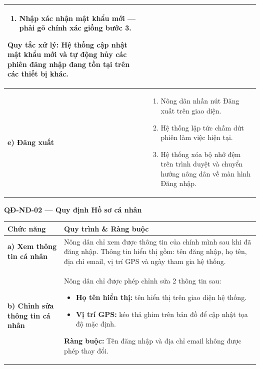 \documentclass[12pt,a4paper]{article}
\begin{document}
\begin{longtable}{|
        >{\raggedright\arraybackslash}p{2.8cm}|
        >{\raggedright\arraybackslash}p{12cm}|}
\begin{enumerate}[leftmargin=*,topsep=2pt,itemsep=1pt]
        \item Nhập \textbf{xác nhận mật khẩu mới} --- phải gõ chính xác giống bước 3.
    \end{enumerate}
    \textbf{Quy tắc xử lý:} Hệ thống cập nhật mật khẩu mới và tự động hủy các phiên đăng nhập đang tồn tại trên các thiết bị khác.                                                                                                                                         \\
    \hline
    \textbf{e) Đăng xuất}          &
    \begin{enumerate}[leftmargin=*,topsep=2pt,itemsep=1pt]
        \item Nông dân nhấn nút Đăng xuất trên giao diện.
        \item Hệ thống lập tức chấm dứt phiên làm việc hiện tại.
        \item Hệ thống xóa bộ nhớ đệm trên trình duyệt và chuyển hướng nông dân về màn hình Đăng nhập.
    \end{enumerate}                                                                                                                                                                      \\
    \hline
\end{longtable}

\vspace{0.3cm}
\noindent\textbf{QĐ-ND-02 --- Quy định Hồ sơ cá nhân}

\begin{longtable}{|
        >{\raggedright\arraybackslash}p{2.8cm}|
        >{\raggedright\arraybackslash}p{12cm}|}
    \hline
    \rowcolor{headerblue}
    \textbf{Chức năng}                      & \textbf{Quy trình \& Ràng buộc}                                                                                                \\
    \hline
    \endhead
    \textbf{a) Xem thông tin cá nhân}       &
    Nông dân chỉ xem được thông tin của chính mình sau khi đã đăng nhập. Thông tin hiển thị gồm: tên đăng nhập, họ tên, địa chỉ email, vị trí GPS và ngày tham gia hệ thống. \\
    \hline
    \textbf{b) Chỉnh sửa thông tin cá nhân} &
    Nông dân chỉ được phép chỉnh sửa 2 thông tin sau:
    \begin{itemize}[leftmargin=*,topsep=2pt,itemsep=1pt]
        \item \textbf{Họ tên hiển thị:} tên hiển thị trên giao diện hệ thống.
        \item \textbf{Vị trí GPS:} kéo thả ghim trên bản đồ để cập nhật tọa độ mặc định.
    \end{itemize}
    \textbf{Ràng buộc:} Tên đăng nhập và địa chỉ email không được phép thay đổi.                                                                                             \\
    \hline
\end{longtable}
\end{document}
